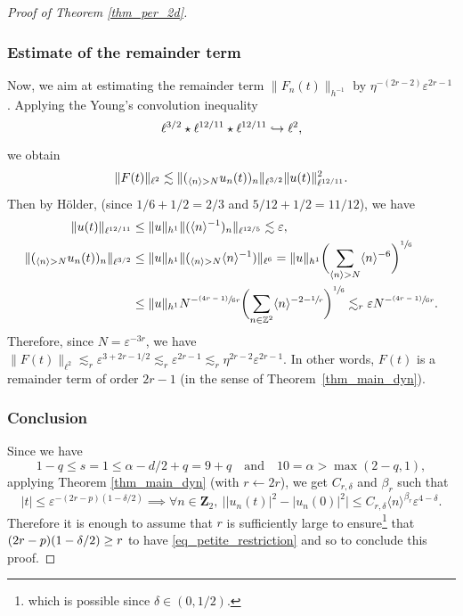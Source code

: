 \documentclass[11pt]{article}
\makeatletter
\newcommand\hto{\mathrel{\lhook\joinrel\to}}
\newcommand{\psfrac}[2]{\sfrac{(#1)}{#2}}
\DeclareRobustCommand{\mathbbm}[1]{\csname jepbb@#1\endcsname}
\theoremstyle{definition}
\makeatother
\begin{document}
\begin{proof}[Proof of Theorem \ref{thm_per_2d}]
\subsubsection*{Estimate of the remainder term}
Now, we aim at estimating the remainder term $\|F_n(t)\|_{h^{-1}}$ by $\eta^{-(2r-2)} \varepsilon^{ 2r-1}$. Applying the Young's convolution inequality
\[
\ell^{3/2} \star \ell^{12/11} \star \ell^{12/11} \hto \ell^2,
\]
we obtain
\[
\| F(t)\|_{\ell^2}\lesssim \| (\mathbbm{1}_{\langle n \rangle > N} u_n(t))_n \|_{\ell^{3/2}} \| u(t) \|_{\ell^{12/11}}^2.
\]
Then by Hölder, (since $1/6+1/2=2/3$ and $5/12 + 1/2= 11/12$), we have
\begin{align*}
\| u(t) \|_{\ell^{12/11}} &\leq \|u\|_{h^1} \| (\langle n \rangle^{-1})_n \|_{\ell^{12/5}} \lesssim \varepsilon,
\\
\| (\mathbbm{1}_{\langle n \rangle > N} u_n(t))_n \|_{\ell^{3/2}} &\leq \|u\|_{h^1} \| (\mathbbm{1}_{\langle n \rangle > N} \langle n \rangle^{-1}) \|_{\ell^6} = \|u\|_{h^1} \biggl(\sum_{ \langle n \rangle > N } \langle n \rangle^{-6} \biggr)^{\sfrac16} \\
&\leq \|u\|_{h^1} N^{- \psfrac{4r-1}{6r}} \biggl(\sum_{ n\in \mathbb{Z}^2 } \langle n \rangle^{-2-\sfrac{1}r} \biggr)^{\sfrac16} \lesssim_r \varepsilon N^{- \psfrac{4r-1}{6r}}.
\end{align*}
Therefore, since $N=\varepsilon^{-3r}$, we have $\| F(t)\|_{\ell^2} \lesssim_r \varepsilon^{3+2r - 1/2} \lesssim_r \varepsilon^{ 2r-1} \lesssim_r \eta^{2r-2} \varepsilon^{ 2r-1}$. In other words, $F(t)$ is a remainder term of order $2r-1$ (in the sense of Theorem~\ref{thm_main_dyn}).

\subsubsection*{Conclusion}
Since we have
\[
1 - q\leq s=1 \leq \alpha - d/2 +q =9+q \quad\text{and}\quad 10=\alpha > \max(2-q,1),
\]
applying Theorem \ref{thm_main_dyn} (with $r\leftarrow 2r$), we get $C_{r,\delta}$ and $\beta_r$ such that
\[
|t| \leq \varepsilon^{-(2r-p)(1-\delta/2)} \implies \forall n \in \mathbf{Z}_2, \ \bigl||u_n(t)|^2 - |u_n(0)|^2 \bigr| \leq C_{r,\delta} \langle n \rangle^{\beta_r} \varepsilon^{4-\delta}.
\]
Therefore it is enough to assume that $r$ is sufficiently large to ensure\footnote{which is possible since $\delta \in (0,1/2)$.} that $(2r-\nobreak p)(1-\nobreak\delta/2) \geq r $ to have \eqref{eq_petite_restriction} and so to conclude this proof.
\end{proof}
\end{document}
